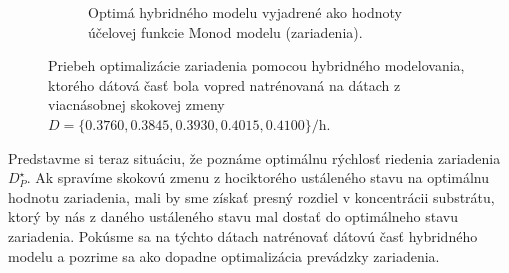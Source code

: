 \begin{figure}
\begin{subfigure}[b]{0.49\textwidth}
		\caption{Optimá hybridného modelu vyjadrené ako hodnoty účelovej funkcie Monod modelu (zariadenia).}
		\label{fig:hybrid_multipleStep_costFun}
	\end{subfigure}
	\caption{Priebeh optimalizácie zariadenia pomocou hybridného modelovania, ktorého dátová časť bola vopred natrénovaná na dátach z viacnásobnej skokovej zmeny $ D = \lbrace 0.3760, 0.3845, 0.3930, 0.4015, 0.4100 \rbrace \si{\per\hour} $.}
	\label{fig:hybrid_multipleStep_approach}
\end{figure}

Predstavme si teraz situáciu, že poznáme optimálnu rýchlosť riedenia zariadenia $ D_{P}^{\star} $. Ak spravíme skokovú zmenu z hociktorého ustáleného stavu na optimálnu hodnotu zariadenia, mali by sme získať presný rozdiel v koncentrácii substrátu, ktorý by nás z daného ustáleného stavu mal dostať do optimálneho stavu zariadenia. Pokúsme sa na týchto dátach natrénovať dátovú časť hybridného modelu a pozrime sa ako dopadne optimalizácia prevádzky zariadenia.
